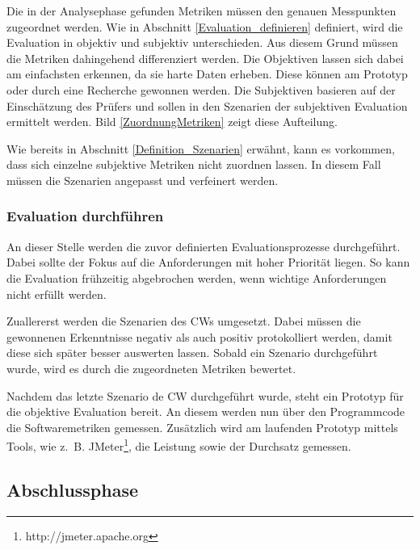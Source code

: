 Die in der Analysephase gefunden Metriken müssen den genauen Messpunkten zugeordnet werden. Wie in Abschnitt \ref{Evaluation_definieren} definiert, wird die Evaluation in objektiv und subjektiv unterschieden. Aus diesem Grund müssen die Metriken dahingehend differenziert werden. Die Objektiven lassen sich dabei am einfachsten erkennen, da sie harte Daten erheben. Diese können am Prototyp oder durch eine Recherche gewonnen werden.
Die Subjektiven basieren auf der Einschätzung des Prüfers und sollen in den Szenarien der subjektiven Evaluation ermittelt werden. Bild \ref{ZuordnungMetriken} zeigt diese Aufteilung. 


Wie bereits in Abschnitt \ref{Definition_Szenarien} erwähnt, kann es vorkommen, dass sich einzelne subjektive Metriken nicht zuordnen lassen. In diesem Fall müssen die Szenarien angepasst und verfeinert werden. 

\subsubsection{Evaluation durchführen}

An dieser Stelle werden die zuvor definierten Evaluationsprozesse durchgeführt. Dabei sollte der Fokus auf die Anforderungen mit hoher Priorität liegen. So kann die Evaluation frühzeitig abgebrochen werden, wenn wichtige Anforderungen nicht erfüllt werden.

Zuallererst werden die Szenarien des \acp{CW} umgesetzt. Dabei müssen die gewonnenen Erkenntnisse negativ als auch positiv protokolliert werden, damit diese sich später besser auswerten lassen. Sobald ein Szenario durchgeführt wurde, wird es durch die zugeordneten Metriken bewertet.

Nachdem das letzte Szenario de \ac{CW} durchgeführt wurde, steht ein Prototyp für die objektive Evaluation bereit. An diesem werden nun über den Programmcode die Softwaremetriken gemessen. Zusätzlich wird am laufenden Prototyp mittels Tools, wie z.~B. JMeter\footnote{http://jmeter.apache.org}, die Leistung sowie der Durchsatz gemessen.

\subsection{Abschlussphase}

